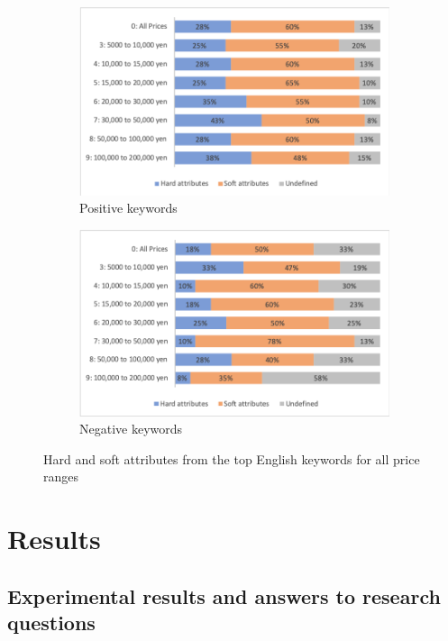\documentclass[smallextended,natbib]{svjour3}       %
\begin{document}
  \begin{figure}[ht]
      \centering
      \begin{subfigure}[b]{0.45\textwidth}
          \includegraphics[width=\textwidth]{hard_soft_attr_en_pos.png}
          \caption{Positive keywords}
      \end{subfigure}
      \begin{subfigure}[b]{0.45\textwidth}
          \includegraphics[width=\textwidth]{hard_soft_attr_en_neg.png}
          \caption{Negative keywords}
      \end{subfigure}
  \caption{Hard and soft attributes from the top English keywords for all price ranges}
  \label{fig:hard_soft_en}
  \end{figure}


\section{Results}\label{results}

  \subsection{Experimental results and answers to research questions}
\end{document}
